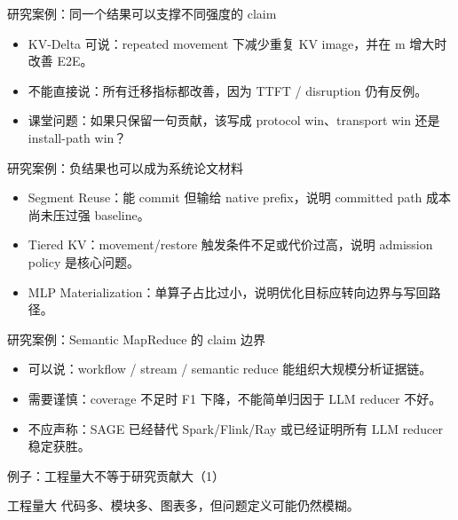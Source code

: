 \begin{frame}{研究案例：同一个结果可以支撑不同强度的 claim}
  \begin{itemize}
    \item KV-Delta 可说：repeated movement 下减少重复 KV image，并在 m 增大时改善 E2E。
    \item 不能直接说：所有迁移指标都改善，因为 TTFT / disruption 仍有反例。
    \item 课堂问题：如果只保留一句贡献，该写成 protocol win、transport win 还是 install-path win？
  \end{itemize}
\end{frame}

\begin{frame}{研究案例：负结果也可以成为系统论文材料}
  \begin{itemize}
    \item Segment Reuse：能 commit 但输给 native prefix，说明 committed path 成本尚未压过强 baseline。
    \item Tiered KV：movement/restore 触发条件不足或代价过高，说明 admission policy 是核心问题。
    \item MLP Materialization：单算子占比过小，说明优化目标应转向边界与写回路径。
  \end{itemize}
\end{frame}

\begin{frame}{研究案例：Semantic MapReduce 的 claim 边界}
  \begin{itemize}
    \item 可以说：workflow / stream / semantic reduce 能组织大规模分析证据链。
    \item 需要谨慎：coverage 不足时 F1 下降，不能简单归因于 LLM reducer 不好。
    \item 不应声称：SAGE 已经替代 Spark/Flink/Ray 或已经证明所有 LLM reducer 稳定获胜。
  \end{itemize}
\end{frame}

\begin{frame}{例子：工程量大不等于研究贡献大（1）}
\begin{block}{工程量大}
    代码多、模块多、图表多，但问题定义可能仍然模糊。
  \end{block}
\end{frame}

